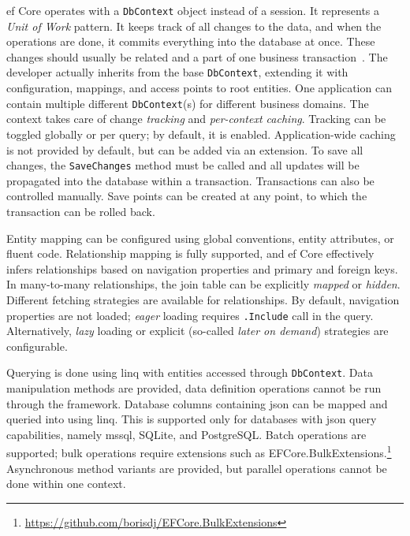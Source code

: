 \acrshort{ef} Core operates with a \texttt{DbContext} object instead of a session. It represents a \textit{Unit of Work} pattern. It keeps track of all changes to the data, and when the operations are done, it commits everything into the database at once. These changes should usually be related and a part of one business transaction~\cite{FowlerUOW}. The developer actually inherits from the base \texttt{DbContext}, extending it with configuration, mappings, and access points to root entities. One application can contain multiple different \texttt{DbContext}(s) for different business domains. The context takes care of change \textit{tracking} and \textit{per-context caching}. Tracking can be toggled globally or per query; by default, it is enabled. Application-wide caching is not provided by default, but can be added via an extension. To save all changes, the \texttt{SaveChanges} method must be called and all updates will be propagated into the database within a transaction. Transactions can also be controlled manually. Save points can be created at any point, to which the transaction can be rolled back.

Entity mapping can be configured using global conventions, entity attributes, or fluent code. Relationship mapping is fully supported, and \acrshort{ef} Core effectively infers relationships based on navigation properties and primary and foreign keys. In many-to-many relationships, the join table can be explicitly \textit{mapped} or \textit{hidden}. Different fetching strategies are available for relationships. By default, navigation properties are not loaded; \textit{eager} loading requires \texttt{.Include} call in the query. Alternatively, \textit{lazy} loading or explicit (so-called \textit{later on demand}) strategies are configurable. 

Querying is done using \acrshort{linq} with entities accessed through \texttt{DbContext}. Data manipulation methods are provided, data definition operations cannot be run through the framework. Database columns containing \acrshort{json} can be mapped and queried into using \acrshort{linq}. This is supported only for databases with \acrshort{json} query capabilities, namely \acrshort{mssql}, SQLite, and PostgreSQL. Batch operations are supported; bulk operations require extensions such as EFCore.BulkExtensions.\footnote{\url{https://github.com/borisdj/EFCore.BulkExtensions}} Asynchronous method variants are provided, but parallel operations cannot be done within one context.

